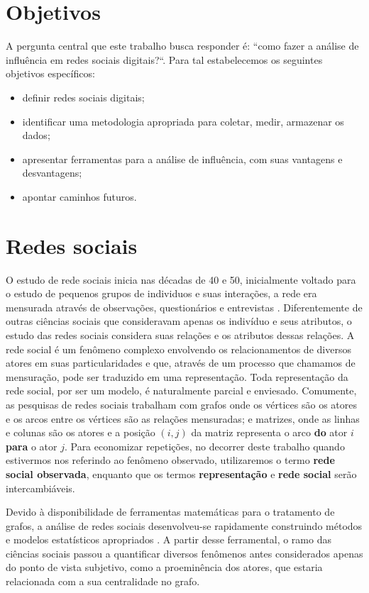 \section{Objetivos}
\label{sec:objetivos}

A pergunta central que este trabalho busca responder é: ``como fazer a análise
de influência em redes sociais digitais?``. Para tal estabelecemos os seguintes
objetivos específicos:

\begin{itemize}
  \item definir redes sociais digitais;
  \item identificar uma metodologia apropriada para coletar, medir, armazenar os
  dados;
  \item apresentar ferramentas para a análise de influência, com suas vantagens
  e desvantagens;
  \item apontar caminhos futuros.
\end{itemize}

\section{Redes sociais}
\label{sec:redes}
O estudo de rede sociais inicia nas décadas de 40 e 50, inicialmente voltado para
o estudo de pequenos grupos de individuos e suas interações, a rede era mensurada
através de observações, questionários e entrevistas \citep{Wasserman}.
Diferentemente de outras ciências sociais que consideravam apenas os indivíduo e
seus atributos, o estudo das redes sociais considera suas relações e os atributos
dessas relações. A rede social é um fenômeno complexo envolvendo os
relacionamentos de diversos atores em suas particularidades e que, através de um
processo que chamamos de mensuração, pode ser traduzido em uma representação.
Toda representação da rede social, por ser um modelo, é naturalmente parcial e
enviesado. Comumente, as pesquisas de redes sociais trabalham com grafos onde os
vértices são os atores e os arcos entre os vértices são as relações mensuradas; e
matrizes, onde as linhas e colunas são os atores e a posição $(i,j)$ da matriz
representa o arco \textbf{do} ator $i$ \textbf{para} o ator $j$. Para economizar
repetições, no decorrer deste trabalho quando estivermos nos referindo ao
fenômeno observado, utilizaremos o termo \textbf{rede social observada}, enquanto
que os termos \textbf{representação} e \textbf{rede social} serão
intercambiáveis.

Devido à disponibilidade de ferramentas matemáticas para o tratamento de grafos,
a análise de redes sociais desenvolveu-se rapidamente construindo métodos e
modelos estatísticos apropriados \citep{Butts2009}. A partir desse ferramental,
o ramo das ciências sociais passou a quantificar diversos fenômenos antes
considerados apenas do ponto de vista subjetivo, como a proeminência dos atores,
que estaria relacionada com a sua centralidade no grafo.

